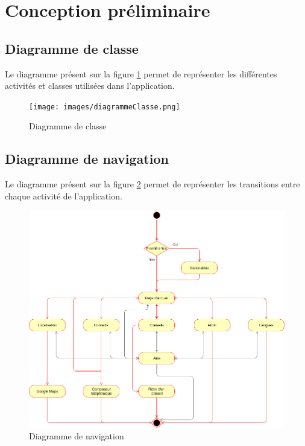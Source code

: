 \section{Conception préliminaire}

\subsection{Diagramme de classe}

	Le diagramme présent sur la figure \ref{diagrammeClasse} permet de représenter les différentes activités et classes utilisées dans l'application. 

\begin{figure}
	\texttt{[image: images/diagrammeClasse.png]}
	\caption{Diagramme de classe}
	\label{diagrammeClasse}
\end{figure}

\subsection{Diagramme de navigation}
	
	Le diagramme présent sur la figure \ref{diagrammeNavigation} permet de représenter les transitions entre chaque activité de l'application. 

\begin{figure}[!h]
	\begin{center}
	
	   \includegraphics[scale=0.6]{images/navigation.png}
	   \caption{Diagramme de navigation}
	   \label{diagrammeNavigation} 	
	\end{center}
\end{figure}

